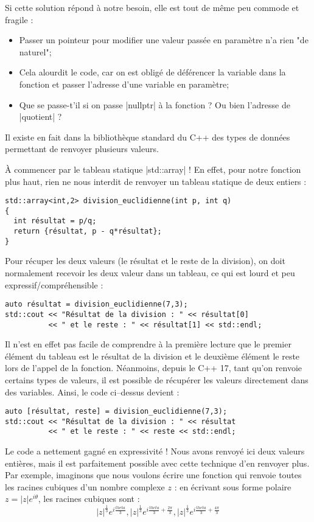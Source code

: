 \begin{itemize}
Si cette solution répond à notre besoin, elle est tout de même peu commode et fragile :
\begin{itemize}
  \item Passer un pointeur pour modifier une valeur passée en paramètre n'a rien "de naturel";
  \item Cela alourdit le code, car on est obligé de déférencer la variable dans la fonction et
        passer l'adresse d'une variable en paramètre;
  \item Que se passe-t'il si on passe |nullptr| à la fonction ? Ou bien l'adresse de |quotient| ?
\end{itemize}

Il existe en fait dans la bibliothèque standard du C++ des types de données permettant de renvoyer
plusieurs valeurs.

À commencer par le tableau statique |std::array| ! En effet, pour notre fonction plus haut, rien ne
nous interdit de renvoyer un tableau statique de deux entiers :
\begin{lstlisting}
std::array<int,2> division_euclidienne(int p, int q)
{
  int résultat = p/q;
  return {résultat, p - q*résultat};
}
\end{lstlisting}

Pour récuper les deux valeurs (le résultat et le reste de la division), on doit normalement recevoir
les deux valeur dans un tableau, ce qui est lourd et peu expressif/compréhensible :
\begin{lstlisting}
auto résultat = division_euclidienne(7,3);
std::cout << "Résultat de la division : " << résultat[0] 
          << " et le reste : " << résultat[1] << std::endl;
\end{lstlisting}

Il n'est en effet pas facile de comprendre à la première lecture que le premier élément du tableau
est le résultat de la division et le deuxième élément le reste lors de l'appel de la fonction.
Néanmoins, depuis le C++ 17, tant qu'on renvoie certains types de valeurs, il est possible de
récupérer les valeurs directement dans des variables. Ainsi, le code ci--dessus devient :
\begin{lstlisting}
auto [résultat, reste] = division_euclidienne(7,3);
std::cout << "Résultat de la division : " << résultat 
          << " et le reste : " << reste << std::endl;
\end{lstlisting}

Le code a nettement gagné en expressivité ! Nous avons renvoyé ici deux valeurs entières, mais il est
parfaitement possible avec cette technique d'en renvoyer plus. Par exemple, imaginons que nous voulons
écrire une fonction qui renvoie toutes les racines cubiques d'un nombre complexe $z$ : en écrivant
sous forme polaire $z=|z|e^{i\theta}$, les racines cubiques sont : 
$$
|z|^{\frac{1}{3}}e^{i\frac{theta}{3}}, |z|^{\frac{1}{3}}e^{i\frac{theta}{3}+\frac{2\pi}{3}},
|z|^{\frac{1}{3}}e^{i\frac{theta}{3}+\frac{4\pi}{3}}
$$


\end{itemize}
